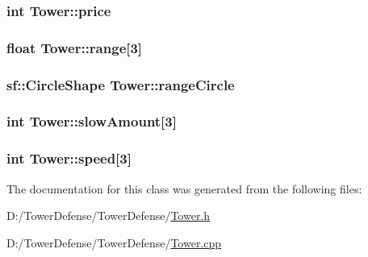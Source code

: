 \hypertarget{class_tower_afb26e285e0177b99871e7ad2b603a459}{
\subsubsection[{price}]{\setlength{\rightskip}{0pt plus 5cm}int Tower\+::price\hspace{0.3cm}{\ttfamily [protected]}}}\label{class_tower_afb26e285e0177b99871e7ad2b603a459}
\hypertarget{class_tower_a7e59dee11464af7439163088ac988955}{
\subsubsection[{range}]{\setlength{\rightskip}{0pt plus 5cm}float Tower\+::range\mbox{[}3\mbox{]}\hspace{0.3cm}{\ttfamily [protected]}}}\label{class_tower_a7e59dee11464af7439163088ac988955}
\hypertarget{class_tower_a4b4dd0d7a6a3469de2e93421156a6486}{
\subsubsection[{range\+Circle}]{\setlength{\rightskip}{0pt plus 5cm}sf\+::\+Circle\+Shape Tower\+::range\+Circle\hspace{0.3cm}{\ttfamily [protected]}}}\label{class_tower_a4b4dd0d7a6a3469de2e93421156a6486}
\hypertarget{class_tower_a88bb2c4d038523ab9430d69ffe508cf1}{
\subsubsection[{slow\+Amount}]{\setlength{\rightskip}{0pt plus 5cm}int Tower\+::slow\+Amount\mbox{[}3\mbox{]}\hspace{0.3cm}{\ttfamily [protected]}}}\label{class_tower_a88bb2c4d038523ab9430d69ffe508cf1}
\hypertarget{class_tower_a06784c625069968923cf19a0cecdf37e}{
\subsubsection[{speed}]{\setlength{\rightskip}{0pt plus 5cm}int Tower\+::speed\mbox{[}3\mbox{]}\hspace{0.3cm}{\ttfamily [protected]}}}\label{class_tower_a06784c625069968923cf19a0cecdf37e}


The documentation for this class was generated from the following files\+:\begin{DoxyCompactItemize}
\item 
D\+:/\+Tower\+Defense/\+Tower\+Defense/\hyperlink{_tower_8h}{Tower.\+h}\item 
D\+:/\+Tower\+Defense/\+Tower\+Defense/\hyperlink{_tower_8cpp}{Tower.\+cpp}\end{DoxyCompactItemize}
